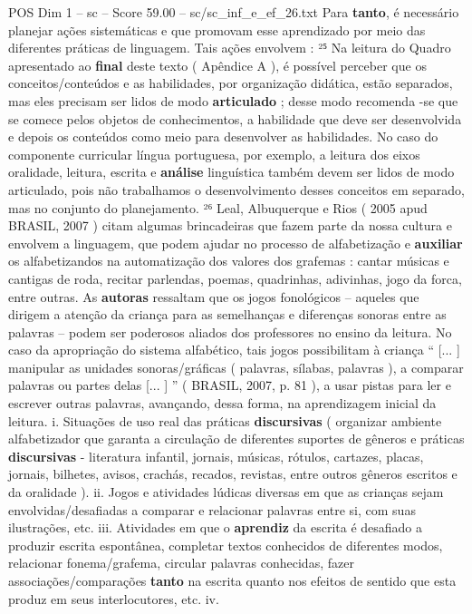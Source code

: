 \begin{textsample}{POS Dim 1 – sc – Score 59.00 – sc/sc\_inf\_e\_ef\_26.txt}
Para \textbf{tanto}, é necessário planejar ações sistemáticas e que promovam esse aprendizado por meio das diferentes práticas de linguagem.
Tais ações envolvem : ²⁵ Na leitura do Quadro apresentado ao \textbf{final} deste texto ( Apêndice A ), é possível perceber que os conceitos/conteúdos e as habilidades, por organização didática, estão separados, mas eles precisam ser lidos de modo \textbf{articulado} ; desse modo recomenda -se que se comece pelos objetos de conhecimentos, a habilidade que deve ser desenvolvida e depois os conteúdos como meio para desenvolver as habilidades.
No caso do componente curricular língua portuguesa, por exemplo, a leitura dos eixos oralidade, leitura, escrita e \textbf{análise} linguística também devem ser lidos de modo articulado, pois não trabalhamos o desenvolvimento desses conceitos em separado, mas no conjunto do planejamento. ²⁶ Leal, Albuquerque e Rios ( 2005 apud BRASIL, 2007 ) citam algumas brincadeiras que fazem parte da nossa cultura e envolvem a linguagem, que podem ajudar no processo de alfabetização e \textbf{auxiliar} os alfabetizandos na automatização dos valores dos grafemas : cantar músicas e cantigas de roda, recitar parlendas, poemas, quadrinhas, adivinhas, jogo da forca, entre outras.
As \textbf{autoras} ressaltam que os jogos fonológicos – aqueles que dirigem a atenção da criança para as semelhanças e diferenças sonoras entre as palavras – podem ser poderosos aliados dos professores no ensino da leitura.
No caso da apropriação do sistema alfabético, tais jogos possibilitam à criança “ [... ] manipular as unidades sonoras/gráficas ( palavras, sílabas, palavras ), a comparar palavras ou partes delas [... ] ” ( BRASIL, 2007, p. 81 ), a usar pistas para ler e escrever outras palavras, avançando, dessa forma, na aprendizagem inicial da leitura. i.
Situações de uso real das práticas \textbf{discursivas} ( organizar ambiente alfabetizador que garanta a circulação de diferentes suportes de gêneros e práticas \textbf{discursivas} - literatura infantil, jornais, músicas, rótulos, cartazes, placas, jornais, bilhetes, avisos, crachás, recados, revistas, entre outros gêneros escritos e da oralidade ). ii.
Jogos e atividades lúdicas diversas em que as crianças sejam envolvidas/desafiadas a comparar e relacionar palavras entre si, com suas ilustrações, etc. iii.
Atividades em que o \textbf{aprendiz} da escrita é desafiado a produzir escrita espontânea, completar textos conhecidos de diferentes modos, relacionar fonema/grafema, circular palavras conhecidas, fazer associações/comparações \textbf{tanto} na escrita quanto nos efeitos de sentido que esta produz em seus interlocutores, etc. iv.

\end{textsample}
